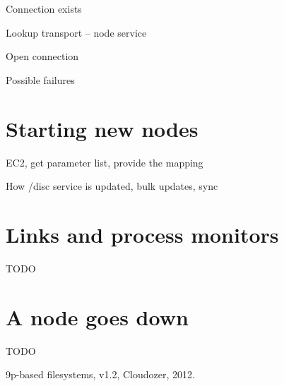 \documentclass{scrartcl}
\begin{document}
Connection exists

Lookup transport -- node service

Open connection

Possible failures

\section*{Starting new nodes}

EC2, get parameter list, provide the mapping

How /disc service is updated, bulk updates, sync

\section*{Links and process monitors}

TODO

\section*{A node goes down}

TODO

\begin{thebibliography}{1}
	9p-based filesystems,
	v1.2,
	Cloudozer,
	2012.
\end{thebibliography}
\end{document}
